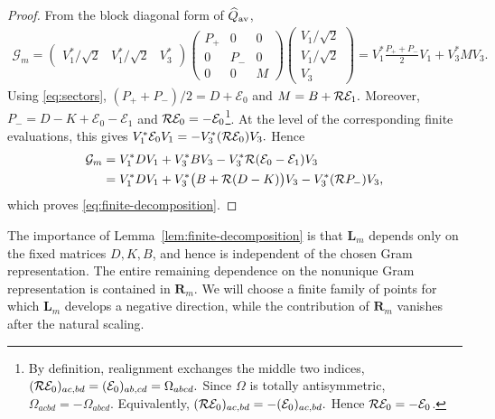 \begin{proof}
From the block diagonal form of $\widehat Q_{\rm av}$,
\[
\begin{aligned}
\mathcal G_m
=
\left(
\begin{array}{ccc}
V_1^*/\sqrt2&
V_1^*/\sqrt2&
V_3^*
\end{array}
\right)
\left(
\begin{array}{ccc}
P_+&0&0\\
0&P_-&0\\
0&0&M
\end{array}
\right)
\left(
\begin{array}{c}
V_1/\sqrt2\\
V_1/\sqrt2\\
V_3
\end{array}
\right)=
V_1^*\frac{P_++P_-}{2}V_1
+
V_3^*MV_3.
\end{aligned}
\]
Using \eqref{eq:sectors},
$
(P_++P_-)/2=D+\mathcal E_0
$
and
$
M=B+\mathcal{R}\mathcal E_1.
$
Moreover,
$
P_-=D-K+\mathcal E_0-\mathcal E_1
$
 and $\mathcal{R} \mathcal E_0=-\mathcal E_0$\footnote{By definition, realignment exchanges the middle two indices,
$
 (\mathcal{R} \mathcal E_0)_{ac,bd}
 =(\mathcal E_0)_{ab,cd}
 =\Omega_{abcd}.
$
Since $\Omega$ is totally antisymmetric,
$
 \Omega_{acbd}=-\Omega_{abcd}.
$
Equivalently,
$
 (\mathcal{R} \mathcal E_0)_{ac,bd}
 =-(\mathcal E_0)_{ac,bd}.
$
Hence $\mathcal{R} \mathcal E_0=-\mathcal E_0$.}.
At the level of the corresponding finite evaluations,
this gives
$
V_1^*\mathcal E_0V_1=-V_3^*(\mathcal{R} \mathcal E_0)V_3.
$
Hence
\[
\begin{aligned}
\mathcal G_m
&=
V_1^*DV_1
+
V_3^*BV_3
-
V_3^*\mathcal{R}(\mathcal E_0-\mathcal E_1)V_3\\
&=
V_1^*DV_1
+
V_3^*
\bigl(B+\mathcal{R}(D-K)\bigr)V_3
-
V_3^*(\mathcal{R} P_-)V_3,
\end{aligned}
\]
which proves \eqref{eq:finite-decomposition}.
\end{proof}

The importance of Lemma~\ref{lem:finite-decomposition} is that
$\mathbf L_m$ depends only on the fixed matrices $D,K,B$, and hence is
independent of the chosen Gram representation.  The entire remaining
dependence on the nonunique Gram representation is contained in
$\mathbf R_m$.  We will choose a finite family of points for which
$\mathbf L_m$ develops a negative direction, while the contribution of
$\mathbf R_m$ vanishes after the natural scaling.


